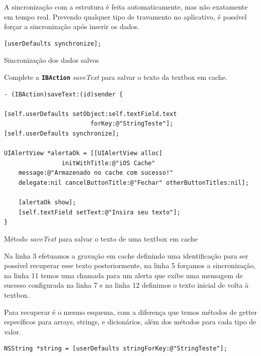 \documentclass[a4paper,12pt,brazil,doubleside]{book}
\begin{document}
\begin{singlespace}
A sincronização com a estrutura é feita automaticamente, mas não exatamente em tempo real. Prevendo qualquer tipo de travamento no aplicativo, é possível forçar a sincronização após inserir os dados.

\begin{listing}[H]
\begin{verbatim}
[userDefaults synchronize];
\end{verbatim}
\caption{Sincronização dos dados salvos}
\end{listing}


Complete a \texttt{\textbf{IBAction}} \emph{saveText} para salvar o texto da textbox em cache.

\begin{listing}[H]
\begin{verbatim}
- (IBAction)saveText:(id)sender {
    
[self.userDefaults setObject:self.textField.text 
						forKey:@"StringTeste"];
[self.userDefaults synchronize];
    
UIAlertView *alertaOk = [[UIAlertView alloc] 
				initWithTitle:@"iOS Cache" 
	message:@"Armazenado no cache com sucesso!"
	delegate:nil cancelButtonTitle:@"Fechar" otherButtonTitles:nil];
    
    [alertaOk show];
    [self.textField setText:@"Insira seu texto"];
}
\end{verbatim}
\caption{Método \emph{saveText} para salvar o texto de uma textbox em cache}
\end{listing}


Na linha 3 efetuamos a gravação em cache definindo uma identificação para ser possível recuperar esse texto posteriormente, na linha 5 forçamos a sincronização, na linha 11 temos uma chamada para um alerta que exibe uma mensagem de sucesso configurada na linha 7 e na linha 12 definimos o texto inicial de volta à textbox.


Para recuperar é o mesmo esquema, com a diferença que temos métodos de getter específicos para arrays, strings, e dicionários, além dos métodos para cada tipo de valor.

\begin{listing}[H]
\begin{verbatim}
NSString *string = [userDefaults stringForKey:@"StringTeste"];


\end{verbatim}
\end{listing}
\end{singlespace}
\end{document}
